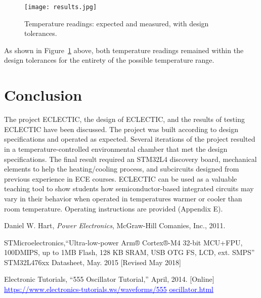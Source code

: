 \documentclass[11pt,letter]{article}
\providecommand{\DIFaddbeginFL}{} %
\providecommand{\DIFaddendFL}{} %
\providecommand{\DIFdelbeginFL}{} %
\providecommand{\DIFdelendFL}{} %
\newcommand{\DIFscaledelfig}{0.5}
\newlength{\DIFdelgraphicswidth} %
\newlength{\DIFdelgraphicsheight} %
\newcommand{\DIFaddincludegraphics}[2][]{{\color{blue}\fbox{\DIFOincludegraphics[#1]{#2}}}} %
\newcommand{\DIFdelincludegraphics}[2][]{%
\sbox{\DIFdelgraphicsbox}{\DIFOincludegraphics[#1]{#2}}%
\settoboxwidth{\DIFdelgraphicswidth}{\DIFdelgraphicsbox} %
\settoboxtotalheight{\DIFdelgraphicsheight}{\DIFdelgraphicsbox} %
\scalebox{\DIFscaledelfig}{%
\parbox[b]{\DIFdelgraphicswidth}{\usebox{\DIFdelgraphicsbox}\\[-\baselineskip] \rule{\DIFdelgraphicswidth}{0em}}\llap{\resizebox{\DIFdelgraphicswidth}{\DIFdelgraphicsheight}{%
\setlength{\unitlength}{\DIFdelgraphicswidth}%
\begin{picture}(1,1)%
\thicklines\linethickness{2pt} %
{\color[rgb]{1,0,0}\put(0,0){\framebox(1,1){}}}%
{\color[rgb]{1,0,0}\put(0,0){\line( 1,1){1}}}%
{\color[rgb]{1,0,0}\put(0,1){\line(1,-1){1}}}%
\end{picture}%
}\hspace*{3pt}}} %
} %
\DeclareRobustCommand{\DIFaddbeginFL}{\DIFOaddbeginFL \let\includegraphics\DIFaddincludegraphics} %
\DeclareRobustCommand{\DIFaddendFL}{\DIFOaddendFL \let\includegraphics\DIFOincludegraphics} %
\DeclareRobustCommand{\DIFdelbeginFL}{\DIFOdelbeginFL \let\includegraphics\DIFdelincludegraphics} %
\DeclareRobustCommand{\DIFdelendFL}{\DIFOaddendFL \let\includegraphics\DIFOincludegraphics} %
\begin{document}
\begin{figure}[H]
    \centering
    \DIFdelbeginFL %
\DIFdelendFL \DIFaddbeginFL \texttt{[image: results.jpg]}
    \DIFaddendFL \caption{Temperature readings: expected and measured, with design tolerances.}
    \label{fig:comparison}
\end{figure}

As shown in Figure~\ref{fig:comparison} above, both temperature readings remained within the design tolerances for the entirety of the possible temperature range.

\section{Conclusion}

The project ECLECTIC, the design of ECLECTIC, and the results of testing ECLECTIC have been discussed. The project was built according to design specifications and operated as expected. Several iterations of the project resulted in a temperature-controlled environmental chamber that met the design specifications. The final result required an STM32L4 discovery board, mechanical elements to help the heating/cooling process, and subcircuits designed from previous experience in ECE courses. ECLECTIC can be used as a valuable teaching tool to show students how semiconductor-based integrated circuits may vary in their behavior when operated in temperatures warmer or cooler than room temperature. Operating instructions are provided (Appendix E). 

\begin{thebibliography}{9}
Daniel W. Hart, \textit{Power Electronics}, McGraw-Hill Comanies, Inc., 2011.

STMicroelectronics,``Ultra-low-power Arm® Cortex®-M4 32-bit MCU+FPU, 100DMIPS, up to 1MB Flash, 128 KB SRAM, USB OTG FS, LCD, ext. SMPS'' STM32L476xx Datasheet, May. 2015
[Revised May 2018]

Electronic Tutorials, ``555 Oscillator Tutorial,'' April, 2014. [Online] \newline
\textcolor{blue}{\underline{https://www.electronics-tutorials.ws/waveforms/555$\_$oscillator.html}} 
\end{thebibliography}

\newpage


\end{document}
